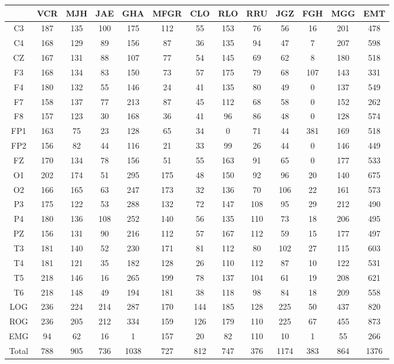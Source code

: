 \documentclass[12pt,a4paper]{mitthesis}
\begin{document}
\begin{SidewaysFigure}
\centering
\begin{tabular}{c|ccccc|cccc|ccc}
& VCR & MJH & JAE & GHA & MFGR
& CLO & RLO & RRU & JGZ
& FGH & MGG & EMT \\
\hline
C3&187&135&100&175&112&55&153&76&56&16&201&478 \\
C4&168&129&89&156&87&36&135&94&47&7&207&598 \\
CZ&167&131&88&107&77&54&145&69&62&8&180&518 \\
F3&168&134&83&150&73&57&175&79&68&107&143&331 \\
F4&180&132&55&146&24&41&135&80&49&0&137&549 \\
F7&158&137&77&213&87&45&112&68&58&0&152&262 \\
F8&157&123&30&168&36&41&96&86&48&0&128&574 \\
FP1&163&75&23&128&65&34&0&71&44&381&169&518 \\
FP2&156&82&44&116&21&33&99&26&44&0&146&449 \\
FZ&170&134&78&156&51&55&163&91&65&0&177&533 \\
O1&202&174&51&295&175&48&150&92&96&20&140&675 \\
O2&166&165&63&247&173&32&136&70&106&22&161&573 \\
P3&175&122&53&288&132&72&147&108&95&29&212&490 \\
P4&180&136&108&252&140&56&135&110&73&18&206&495 \\
PZ&156&131&90&216&112&57&167&112&59&15&177&497 \\
T3&181&140&52&230&171&81&112&80&102&27&115&603 \\
T4&181&121&35&182&128&26&110&112&87&10&122&531 \\
T5&218&146&16&265&199&78&137&104&61&19&208&621 \\
T6&218&148&49&194&181&38&118&98&84&18&209&558 \\
LOG&236&224&214&287&170&144&185&128&225&50&437&820 \\
ROG&236&205&212&334&159&126&179&110&225&67&455&873 \\
EMG&94&62&16&1&157&20&82&110&10&1&55&266 \\
\hline
Total&788&905&736&1038&727&812&747&376&1174&383&864&1376
\end{tabular}
\caption{Total  de \'epocas PE dentro del registro pero que no fueron clasificadas
como MOR (fases W y N) para cada
canal. %
}
\label{total_gpos_nmor}
\end{SidewaysFigure}
\end{document}
